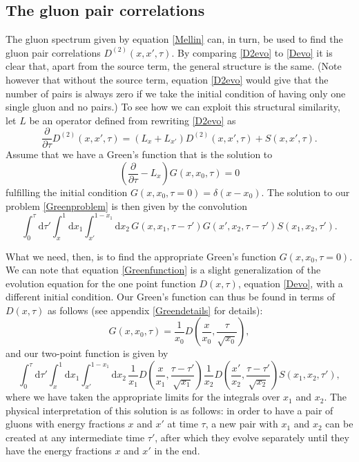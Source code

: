 \documentclass[a4paper,12pt]{article}
\newcommand{\party}[2]{\frac{\partial{#1}}{\partial{#2}}}
\numberwithin{equation}{section}
\begin{document}
\subsection{The gluon pair correlations}
The gluon spectrum given by equation \eqref{Mellin} can, in turn, be used to find the gluon pair correlations $D^{(2)}(x,x',\tau)$. By comparing \eqref{D2evo} to \eqref{Devo} it is clear that, apart from the source term, the general structure is the same. (Note however that without the source term, equation \eqref{D2evo} would give that the number of pairs is always zero if we take the initial condition of having only one single gluon and no pairs.) To see how we can exploit this structural similarity, let $L$ be an operator defined from rewriting \eqref{D2evo} as
\begin{equation}\label{Greenproblem}
\party{}{\tau}D^{(2)}(x,x',\tau) = (L_x + L_{x'})D^{(2)}(x,x',\tau)+S(x,x',\tau).
\end{equation}
Assume that we have a Green's function that is the solution to
\begin{equation}\label{Greenfunction}
\left(\party{}{\tau}- L_x\right)G(x,x_0,\tau)=0
\end{equation}
fulfilling the initial condition $G(x,x_0,\tau=0)=\delta(x-x_0)$. The solution to our problem \eqref{Greenproblem} is then given by the convolution
\begin{equation}
\int_0^\tau \mathrm{d}\tau' \int_x^1 \mathrm{d}x_1 \int_{x'}^{1-x_1} \mathrm{d}x_2\, G(x,x_1,\tau-\tau') G(x',x_2,\tau-\tau') S(x_1,x_2,\tau').
\end{equation}


What we need, then, is to find the appropriate Green's function $G(x,x_0,\tau=0)$. We can note that equation \eqref{Greenfunction} is a slight generalization of the evolution equation for the one point function $D(x,\tau)$, equation \eqref{Devo}, with a different initial condition. Our Green's function can thus be found in terms of $D(x,\tau)$ as follows (see appendix \ref{Greendetails} for details):
\begin{equation}
G(x,x_0,\tau) = \frac{1}{x_0} D\left(\frac{x}{x_0},\frac{\tau}{\sqrt{x_0}}\right),
\end{equation}
and our two-point function is given by 
\begin{equation}\label{D2}
\int_0^\tau \mathrm{d}\tau' \int_x^1 \mathrm{d}x_1 \int_{x'}^{1-x_1} \mathrm{d}x_2\, 
\frac{1}{x_1} D\left(\frac{x}{x_1},\frac{\tau-\tau'}{\sqrt{x_1}}\right)
\frac{1}{x_2} D\left(\frac{x'}{x_2},\frac{\tau-\tau'}{\sqrt{x_2}}\right)
S(x_1,x_2,\tau'),
\end{equation}
where we have taken the appropriate limits for the integrals over $x_1$ and $x_2$. The physical interpretation of this solution is as follows: in order to have a pair of gluons with energy fractions $x$ and $x'$ at time $\tau$, a new pair with $x_1$ and $x_2$ can be created at any intermediate time $\tau'$, after which they evolve separately until they have the energy fractions $x$ and $x'$ in the end. 
\end{document}
